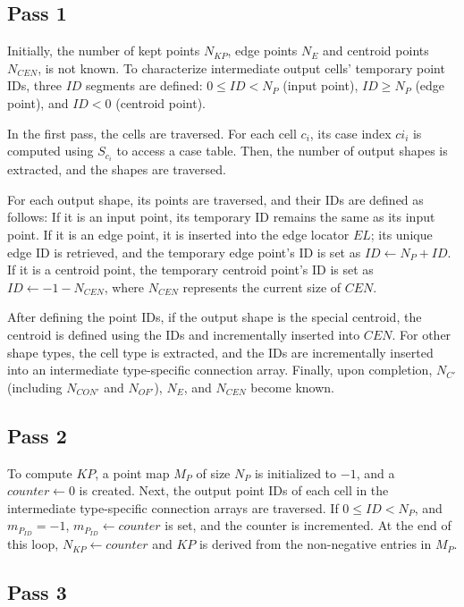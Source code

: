 \documentclass{egpubl}
\begin{document}
\subsection{Pass 1}

Initially, the number of kept points $N_{KP}$, edge points $N_E$ and centroid points $N_{CEN}$, is not known. To characterize intermediate output cells' temporary point IDs, three $ID$ segments are defined:  $0 \leq ID < N_P$ (input point), $ID \geq N_P$ (edge point), and $ID < 0$ (centroid point).

In the first pass, the cells are traversed. For each cell $c_i$, its case index $ci_i$ is computed using $S_{c_i}$ to access a case table. Then, the number of output shapes is extracted, and the shapes are traversed.

For each output shape, its points are traversed, and their IDs are defined as follows: If it is an input point, its temporary ID remains the same as its input point. If it is an edge point, it is inserted into the edge locator $EL$; its unique edge ID is retrieved, and the temporary edge point's ID is set as $ID \gets N_{P} + ID$. If it is a centroid point, the temporary centroid point's ID is set as $ID \gets -1 - N_{CEN}$, where $N_{CEN}$ represents the current size of $CEN$.

After defining the point IDs, if the output shape is the special centroid, the centroid is defined using the IDs and incrementally inserted into $CEN$. For other shape types, the cell type is extracted, and the IDs are incrementally inserted into an intermediate type-specific connection array. Finally, upon completion, $N_{C'}$ (including $N_{CON'}$ and $N_{OF'}$), $N_E$, and $N_{CEN}$ become known.

\subsection{Pass 2}

To compute $KP$, a point map $M_P$ of size $N_P$ is initialized to $-1$, and a $counter \gets 0$ is created. Next, the output point IDs of each cell in the intermediate type-specific connection arrays are traversed. If $0 \leq \textit{ID} < N_P$, and $m_{P_{ID}} = -1$, $m_{P_{ID}} \gets counter$ is set, and the counter is incremented. At the end of this loop, $N_{KP} \gets counter$ and $KP$ is derived
from the non-negative entries in $M_P$.

\subsection{Pass 3}
\end{document}
